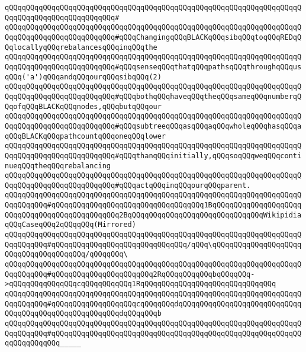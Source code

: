 \verb|qQQqqQQqqQQqqQQqqQQqqQQqqQQqqQQqqQQqqQQqqQQqqQQqqQQqqQQqqQQqqQQqqQQqqQQqqQQqqQQqqQQqqQQqqQQqqQQq#|\newline
\verb|qQQqqQQqqQQqqQQqqQQqqQQqqQQqqQQqqQQqqQQqqQQqqQQqqQQqqQQqqQQqqQQqqQQqqQQqqQQqqQQqqQQqqQQqqQQqqQQq#qQQqChangingqQQqBLACKqQQqsibqQQqtoqQQqREDqQQqlocallyqQQqrebalancesqQQqinqQQqthe|\newline
\verb|qQQqqQQqqQQqqQQqqQQqqQQqqQQqqQQqqQQqqQQqqQQqqQQqqQQqqQQqqQQqqQQqqQQqqQQqqQQqqQQqqQQqqQQqqQQqqQQq#qQQqsenseqQQqthatqQQqpathsqQQqthroughqQQqusqQQq('a')qQQqandqQQqourqQQqsibqQQq(2)|\newline
\verb|qQQqqQQqqQQqqQQqqQQqqQQqqQQqqQQqqQQqqQQqqQQqqQQqqQQqqQQqqQQqqQQqqQQqqQQqqQQqqQQqqQQqqQQqqQQqqQQq#qQQqbothqQQqhaveqQQqtheqQQqsameqQQqnumberqQQqofqQQqBLACKqQQqnodes,qQQqbutqQQqour|\newline
\verb|qQQqqQQqqQQqqQQqqQQqqQQqqQQqqQQqqQQqqQQqqQQqqQQqqQQqqQQqqQQqqQQqqQQqqQQqqQQqqQQqqQQqqQQqqQQqqQQq#qQQqsubtreeqQQqasqQQqaqQQqwholeqQQqhasqQQqaqQQqBLACKqQQqpathcountqQQqoneqQQqlower|\newline
\verb|qQQqqQQqqQQqqQQqqQQqqQQqqQQqqQQqqQQqqQQqqQQqqQQqqQQqqQQqqQQqqQQqqQQqqQQqqQQqqQQqqQQqqQQqqQQqqQQq#qQQqthanqQQqinitially,qQQqsoqQQqweqQQqcontinueqQQqtheqQQqrebalancing|\newline
\verb|qQQqqQQqqQQqqQQqqQQqqQQqqQQqqQQqqQQqqQQqqQQqqQQqqQQqqQQqqQQqqQQqqQQqqQQqqQQqqQQqqQQqqQQqqQQqqQQq#qQQqactqQQqinqQQqourqQQqparent.|\newline
\newline
\verb|qQQqqQQqqQQqqQQqqQQqqQQqqQQqqQQqqQQqqQQqqQQqqQQqqQQqqQQqqQQqqQQqqQQqqQQqqQQqqQQq#qQQqqQQqqQQqqQQqqQQqqQQqqQQqqQQqqQQq1BqQQqqQQqqQQqqQQqqQQqqQQqqQQqqQQqqQQqqQQqqQQqqQQq2BqQQqqQQqqQQqqQQqqQQqqQQqqQQqqQQqWikipidiaqQQqCaseqQQq2qQQqqQQq(Mirrored)|\newline
\verb|qQQqqQQqqQQqqQQqqQQqqQQqqQQqqQQqqQQqqQQqqQQqqQQqqQQqqQQqqQQqqQQqqQQqqQQqqQQqqQQq#qQQqqQQqqQQqqQQqqQQqqQQqqQQqqQQq/qQQq\qQQqqQQqqQQqqQQqqQQqqQQqqQQqqQQqqQQqqQQq/qQQqqQQq\|\newline
\verb|qQQqqQQqqQQqqQQqqQQqqQQqqQQqqQQqqQQqqQQqqQQqqQQqqQQqqQQqqQQqqQQqqQQqqQQqqQQqqQQq#qQQqqQQqqQQqqQQqqQQqqQQq2RqQQqqQQqqQQqbqQQqqQQq->qQQqqQQqqQQqqQQqcqQQqqQQqqQQq1RqQQqqQQqqQQqqQQqqQQqqQQqqQQqqQQq|\newline
\verb|qQQqqQQqqQQqqQQqqQQqqQQqqQQqqQQqqQQqqQQqqQQqqQQqqQQqqQQqqQQqqQQqqQQqqQQqqQQqqQQq#qQQqqQQqqQQqqQQqqQQqcqQQqqQQqdqQQqqQQqqQQqqQQqqQQqqQQqqQQqqQQqqQQqqQQqqQQqqQQqqQQqqQQqdqQQqqQQqb|\newline
\verb|qQQqqQQqqQQqqQQqqQQqqQQqqQQqqQQqqQQqqQQqqQQqqQQqqQQqqQQqqQQqqQQqqQQqqQQqqQQqqQQq#qQQqqQQqqQQqqQQqqQQqqQQqqQQqqQQqqQQqqQQqqQQqqQQqqQQqqQQqqQQqqQQqqQQqqQQq_____|\newline
